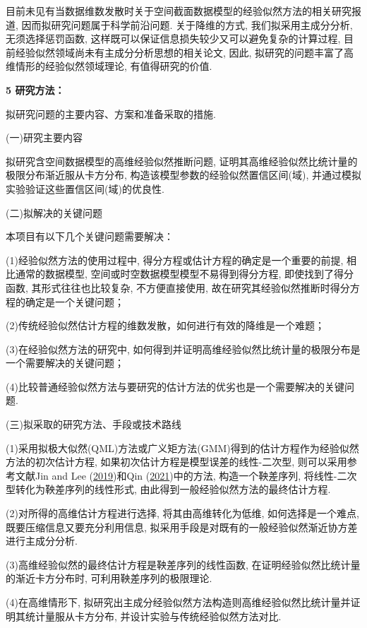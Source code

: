 \documentclass[cs4size]{article}
\def\link{\hyperlink}
\begin{document}
目前未见有当数据维数发散时关于空间截面数据模型的经验似然方法的相关研究报道, 因而拟研究问题属于科学前沿问题. 关于降维的方式, 我们拟采用主成分分析, 无须选择惩罚函数, 这样既可以保证信息损失较少又可以避免复杂的计算过程, 目前经验似然领域尚未有主成分分析思想的相关论文, 因此, 拟研究的问题丰富了高维情形的经验似然领域理论, 有值得研究的价值.

\noindent
{\bf  5 研究方法：}
 
拟研究问题的主要内容、方案和准备采取的措施. 

{\kaishu (一)研究主要内容}

拟研究含空间数据模型的高维经验似然推断问题, 证明其高维经验似然比统计量的极限分布渐近服从卡方分布, 构造该模型参数的经验似然置信区间(域), 并通过模拟实验验证这些置信区间(域)的优良性. 

{\kaishu (二)拟解决的关键问题}

本项目有以下几个关键问题需要解决：

{\kaishu (1)}经验似然方法的使用过程中, 得分方程或估计方程的确定是一个重要的前提, 相比通常的数据模型, 空间或时空数据模型模型不易得到得分方程, 即使找到了得分函数, 其形式往往也比较复杂, 不方便直接使用, 故在研究其经验似然推断时得分方程的确定是一个关键问题；

(2)传统经验似然估计方程的维数发散，如何进行有效的降维是一个难题；

(3)在经验似然方法的研究中, 如何得到并证明高维经验似然比统计量的极限分布是一个需要解决的关键问题；

(4)比较普通经验似然方法与要研究的估计方法的优劣也是一个需要解决的关键问题. 

{\kaishu (三)拟采取的研究方法、手段或技术路线}

(1)采用拟极大似然(QML)方法或广义矩方法(GMM)得到的估计方程作为经验似然方法的初次估计方程, 如果初次估计方程是模型误差的线性-二次型, 则可以采用参考文献Jin and Lee (\link{Jin and Lee 2019}{2019})和Qin (\link{Qin 2021}{2021})中的方法, 构造一个鞅差序列, 将线性-二次型转化为鞅差序列的线性形式, 由此得到一般经验似然方法的最终估计方程. 

(2)对所得的高维估计方程进行选择, 将其由高维转化为低维, 如何选择是一个难点, 既要压缩信息又要充分利用信息, 拟采用手段是对既有的一般经验似然渐近协方差进行主成分分析.

(3)高维经验似然的最终估计方程是鞅差序列的线性函数, 在证明经验似然比统计量的渐近卡方分布时, 可利用鞅差序列的极限理论. 

(4)在高维情形下, 拟研究出主成分经验似然方法构造则高维经验似然比统计量并证明其统计量服从卡方分布, 并设计实验与传统经验似然方法对比.
\end{document}

